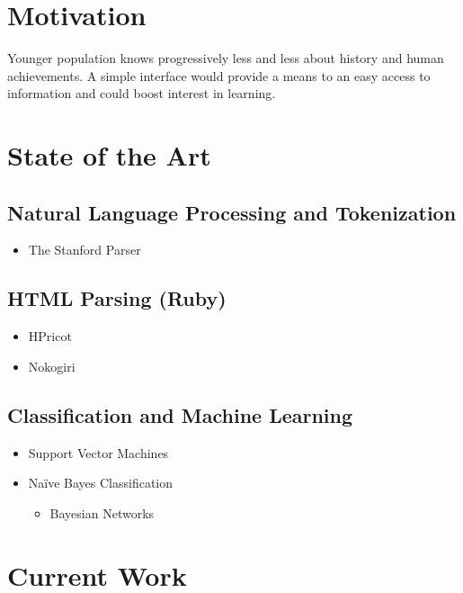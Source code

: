 \documentclass{llncs}
\begin{document}
\section{Motivation}

Younger population knows progressively less and less about history and human achievements. A simple interface would provide a means to an easy access to information and could boost interest in learning.\\

\section{State of the Art}

\subsection{Natural Language Processing and Tokenization}

\begin{itemize}
	\item The Stanford Parser
\end{itemize}

\subsection{HTML Parsing (Ruby)}

\begin{itemize}
	\item HPricot
	\item Nokogiri
\end{itemize}

\subsection{Classification and  Machine Learning}

\begin{itemize}
	\item Support Vector Machines
	\item Naïve Bayes Classification
	\begin{itemize}
		\item Bayesian Networks
	\end{itemize}
\end{itemize}

\section{Current Work}
\end{document}
